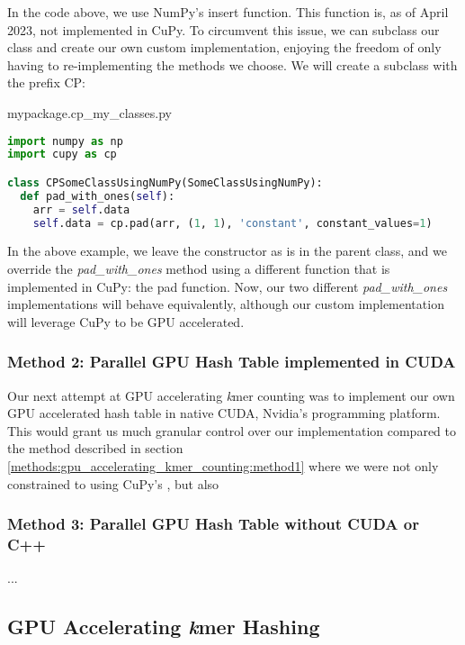 In the code above, we use NumPy's insert function.
This function is, as of April 2023, not implemented in CuPy.
To circumvent this issue, we can subclass our class and create our own custom implementation, enjoying the freedom of only having to re-implementing the methods we choose.
We will create a subclass with the prefix CP:
\begin{center}
mypackage.cp\_my\_classes.py
\end{center}
\begin{lstlisting}[language=Python,style=pycode]
import numpy as np
import cupy as cp

class CPSomeClassUsingNumPy(SomeClassUsingNumPy):
  def pad_with_ones(self):
    arr = self.data
    self.data = cp.pad(arr, (1, 1), 'constant', constant_values=1)
\end{lstlisting}

In the above example, we leave the constructor as is in the parent class, and we override the \textit{pad\_with\_ones} method using a different function that is implemented in CuPy: the pad function.
Now, our two different \textit{pad\_with\_ones} implementations will behave equivalently, although our custom implementation will leverage CuPy to be GPU accelerated.

\subsubsection{Method 2: Parallel GPU Hash Table implemented in CUDA}
Our next attempt at GPU accelerating \textit{k}mer counting was to implement our own GPU accelerated hash table in native CUDA, Nvidia's programming platform.
This would grant us much granular control over our implementation compared to the method described in section \ref{methods:gpu_accelerating_kmer_counting:method1} where we were not only constrained to using CuPy's , but also 

\subsubsection{Method 3: Parallel GPU Hash Table without CUDA or C++}
...

\subsection{GPU Accelerating \textit{k}mer Hashing}


